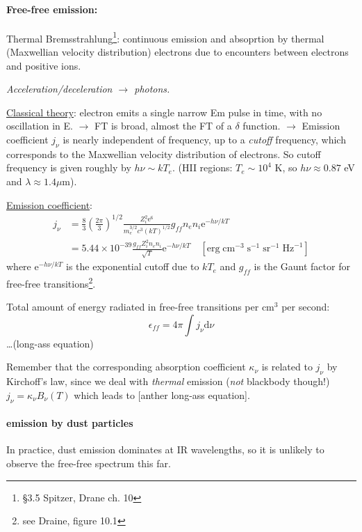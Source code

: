 \documentclass[12pt]{article}
\newcommand{\mar}[1]{\hspace{0pt}\marginpar{-\textcolor{black}{#1}-}}
\newcommand{\mynotes}[1]{{\fontfamily{cmss}\selectfont \textit{#1}}}
\begin{document}
\paragraph{Free-free emission:}
Thermal Bremsstrahlung\footnote{
    \S{3.5} Spitzer, Drane ch. 10}:
continuous emission and absoprtion by thermal (Maxwellian velocity
distribution) electrons due to encounters between electrons and positive ions.

\mynotes{Acceleration/deceleration $\longrightarrow$ photons.}

\underline{Classical theory}: electron emits a single narrow Em pulse in time,
with no oscillation in E. $\rightarrow$ FT is broad, almost the FT of a
$\delta$ function. $\rightarrow$ Emission coefficient $j_{\nu}$ is nearly
independent of frequency, up to a \emph{cutoff} frequency, which corresponds to
the Maxwellian velocity distribution of electrons.
\mar{64}So cutoff frequency
is given roughly by $h\nu \sim kT_{e}$. (HII regions: $T_{e} \sim 10^{4}$ K, so
$h\nu \approx 0.87$ eV and $\lambda \approx 1.4 \mu$m).

\underline{Emission coefficient}:
\begin{align*}
    j_{\nu} &= \frac{8}{3}\left(\frac{2\pi}{3}\right)^{1/2}
    \frac{Z_{i}^{2}\mathrm{e}^{6}}{m_{e}^{3/2}c^{3}(kT)^{1/2}}
    g_{ff}n_{e}n_{i}\mathrm{e}^{-h\nu/kT}\\
    &= 5.44\times10^{-39}\frac{g_{ff}Z_{i}^{2}n_{e}n_{i}}{\sqrt{T}}
    \mathrm{e}^{-h\nu/kT}\quad
    [\mathrm{erg}\;\mathrm{cm}^{-3}\;\mathrm{s}^{-1}\;\mathrm{sr}^{-1}\;\mathrm{Hz}^{-1}]
\end{align*}
where $\mathrm{e}^{-h\nu/kT}$ is the exponential cutoff due to $kT_{e}$
and $g_{ff}$ is the Gaunt factor for free-free transitions\footnote{see
Draine, figure 10.1}.

Total amount of energy radiated in free-free transitions per cm$^{3}$
per second:
$${
    \epsilon_{ff} = 4\pi\int{j_{\nu}\mathrm{d}\nu}
}$$
\ldots (long-ass equation)

Remember that the corresponding absorption coefficient $\kappa_{\nu}$ is
related to $j_{\nu}$ by Kirchoff's law, since we deal with \emph{thermal}
emission (\emph{not} blackbody though!) $j_{\nu} = \kappa_{\nu}B_{\nu}(T)$
which leads to [anther long-ass equation].

\paragraph{emission by dust particles}
In practice, dust emission dominates at IR wavelengths, so it is
unlikely to observe the free-free spectrum this far.
\end{document}

